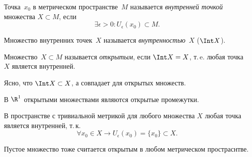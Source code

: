 
\begin{definition}
Точка~\(x_0\) в метрическом пространстве~\(M\) называется \textit{внутренней
точкой} множества \(X \subset M\), если
\[
    \exists \epsilon > 0 \colon U_\epsilon(x_0) \subset M.
\]
\end{definition}

\begin{definition}
Множество внутренних точек~\(X\) называется \textit{внутренностью}~\(X\)
(\(\Int X\)).
\end{definition}

\begin{definition}
Множество~\(X \subset M\) называется \textit{открытым}, если \(\Int X = X\),
т.\,e. любая точка \(X\) является внутренней.
\end{definition}

Ясно, что \(\Int X \subset X\), а совпадает для открытых множеств.

\begin{examples}
В \(\R^1\) открытыми множествами являются открытые промежутки.

В пространстве с тривиальной метрикой для любого множества \(X\) любая точка
является внутренней, т.\,к.
\[
    \forall x_0 \in X \rightarrow U_\epsilon (x_0) = \{x_0\} \subset X.
\]
\end{examples}

\begin{note}
Пустое множество тоже считается открытым в любом метрическом простраснтве.
\end{note}